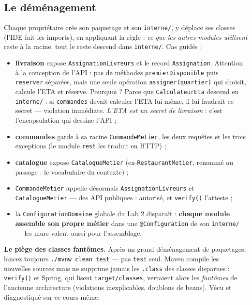 \documentclass[a4paper,11pt]{article}
\begin{document}
\subsection{Le déménagement}

Chaque propriétaire crée son paquetage et son \texttt{interne/}, y déplace
ses classes (l'IDE fait les imports), en appliquant la règle : \emph{ce que
les autres modules utilisent} reste à la racine, tout le reste descend dans
\texttt{interne/}. Cas guidés :

\begin{itemize}[nosep]
  \item \textbf{livraison} expose \texttt{AssignationLivreurs} et le
        record \texttt{Assignation}. Attention à la conception de
        l'API : pas de méthodes \texttt{premierDisponible} puis
        \texttt{reserver} séparées, mais une seule opération
        \texttt{assigner(quartier)} qui choisit,
        calcule l'ETA et réserve. Pourquoi ? Parce que
        \texttt{CalculateurEta} descend en \texttt{interne/} : si
        \texttt{commandes} devait calculer l'ETA lui-même, il lui faudrait
        ce secret --- violation immédiate. \emph{L'ETA est un secret de
        livraison} : c'est l'encapsulation qui dessine l'API ;
  \item \textbf{commandes} garde à sa racine \texttt{CommandeMetier}, les
        deux requêtes et les trois exceptions (le module \texttt{rest} les
        traduit en HTTP) ;
  \item \textbf{catalogue} expose \texttt{CatalogueMetier}
        (ex-\texttt{RestaurantMetier}, renommé au passage : le vocabulaire
        du contexte) ;
  \item \texttt{CommandeMetier} appelle désormais
        \texttt{AssignationLivreurs} et \texttt{CatalogueMetier} --- des
        API publiques : autorisé, et \texttt{verify()} l'atteste ;
  \item la \texttt{ConfigurationDomaine} globale du Lab 2 disparaît :
        \textbf{chaque module assemble son propre métier} dans une
        \texttt{@Configuration} de son \texttt{interne/} --- les murs
        valent aussi pour l'assemblage.
\end{itemize}

\begin{warningbox}
\textbf{Le piège des classes fantômes.} Après un grand déménagement de
paquetages, lancez toujours \texttt{./mvnw clean test} --- pas
\texttt{test} seul. Maven compile les nouvelles sources mais ne supprime
jamais les \texttt{.class} des classes disparues : \texttt{verify()} et
Spring, qui lisent \texttt{target/classes}, verraient alors les
\emph{fantômes} de l'ancienne architecture (violations inexplicables,
doublons de beans). Vécu et diagnostiqué sur ce cours même.
\end{warningbox}
\end{document}
